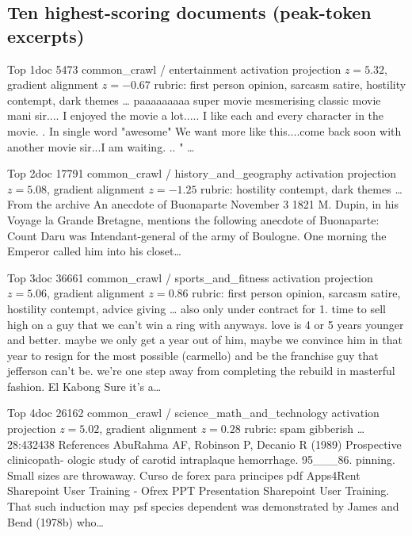 
\subsection{Ten highest-scoring documents (peak-token excerpts)}\label{app:top10}

\begin{docbox}{Top 1}{doc 5473 \textbullet{} common\_crawl / entertainment \textbullet{} activation projection $z=5.32$, gradient alignment $z=-0.67$ \textbullet{} rubric: first person opinion, sarcasm satire, hostility contempt, dark themes}
\ldots{} paaaaaaaaa  super movie  mesmerising classic movie mani sir....  I enjoyed the movie a lot..... I like each and every character in the movie. . In single word "awesome" We want more like this....come back soon with another movie sir...I am waiting. ..   \nonlatin{} \nonlatin{} " \nonlatin{} \nonlatin{}\ldots{}
\end{docbox}

\begin{docbox}{Top 2}{doc 17791 \textbullet{} common\_crawl / history\_and\_geography \textbullet{} activation projection $z=5.08$, gradient alignment $z=-1.25$ \textbullet{} rubric: hostility contempt, dark themes}
\ldots{}From the archive  An anecdote of Buonaparte  November 3 1821  M. Dupin, in his Voyage la Grande Bretagne, mentions the following anecdote of Buonaparte:  Count Daru was Intendant-general of the army of Boulogne. One morning the Emperor called him into his closet\ldots{}
\end{docbox}

\begin{docbox}{Top 3}{doc 36661 \textbullet{} common\_crawl / sports\_and\_fitness \textbullet{} activation projection $z=5.06$, gradient alignment $z=0.86$ \textbullet{} rubric: first person opinion, sarcasm satire, hostility contempt, advice giving}
\ldots{} also only under contract for 1. time to sell high on a guy that we can't win a ring with anyways. love is 4 or 5 years younger and better. maybe we only get a year out of him, maybe we convince him in that year to resign for the most possible (carmello) and be the franchise guy that jefferson can't be.  we're one step away from completing the rebuild in masterful fashion.  El Kabong  Sure it's a\ldots{}
\end{docbox}

\begin{docbox}{Top 4}{doc 26162 \textbullet{} common\_crawl / science\_math\_and\_technology \textbullet{} activation projection $z=5.02$, gradient alignment $z=0.28$ \textbullet{} rubric: spam gibberish}
\ldots{} 28:432438 References AbuRahma AF, Robinson P, Decanio R (1989) Prospective clinicopath- ologic study of carotid intraplaque hemorrhage. 95\_\_\_86. pinning. Small sizes are throwaway.  Curso de forex para principes pdf Apps4Rent Sharepoint User Training - Ofrex PPT Presentation Sharepoint User Training. That such induction may psf species dependent was demonstrated by James and Bend (1978b) who\ldots{}
\end{docbox}

